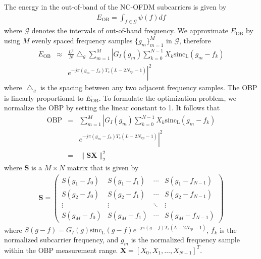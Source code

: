 \documentclass[paper]{ieice}
\begin{document}
The energy in the out-of-band of the NC-OFDM subcarriers is given by
\begin{eqnarray}
E_{\mathrm{OB}} = \int_{f\in \mathcal{G}}\psi(f) df \label{eq:Energy}
\end{eqnarray} 
where $\mathcal{G}$ denotes the intervals of out-of-band frequency.  
We approximate $E_{\mathrm{OB}}$ by using $M$ evenly spaced frequency samples $\{g_{m}\}_{m=1}^{M}$ in $\mathcal{G}$, therefore
\begin{eqnarray}
E_{\mathrm{OB}} & \approx & \frac{L^2}{N}\bigtriangleup_g  \sum_{m=1}^{M} \left|G_I(g_m)\sum_{k=0}^{N-1} X_{k} \mathrm{sinc_L}(g_{m} - f_k)\right. \nonumber\\
&&\left.e^{-j\pi(g_{m} - f_k)T_s(L - 2N_{cp} -1)}\right|^{2} \label{eq: E_OBP}
\end{eqnarray} 
where $\bigtriangleup_g$ is the spacing between any two adjacent frequency samples. The OBP is linearly proportional to $E_{\mathrm{OB}}$.  To formulate the optimization problem, we normalize the OBP by setting the linear constant to 1.  It follows that
\begin{eqnarray}\label{eq:obp}
\mathrm{OBP} &=& \sum_{m=1}^{M} \left|G_I(g_m)\sum_{k=0}^{N-1} X_{k} \mathrm{sinc_L}(g_{m} - f_k)\right. \nonumber\\
&&\left.e^{-j\pi(g_{m} - f_k)T_s(L - 2N_{cp} -1)}\right|^{2}\\
&=& \|\mathbf{S}\mathbf{X}\|_2^2
\end{eqnarray}
where $\mathbf{S}$ is a $M\times N$ matrix that is given by
\mathindent=0mm
\begin{eqnarray}
\mathbf{S} = 
     \begin{pmatrix}
       S(g_1-f_0) & S(g_1-f_1) & \cdots  &  S(g_1-f_{N-1})     \\
       S(g_2-f_0) & S(g_2-f_1) & \cdots  &  S(g_2-f_{N-1})     \\
       \vdots     & \vdots      & \ddots  &  \vdots             \\
       S(g_M-f_0) & S(g_M-f_1) & \cdots  &  S(g_M-f_{N-1})
     \end{pmatrix}\nonumber
\end{eqnarray}
\mathindent=7mm
where $S(g-f) = G_I(g)\mathrm{sinc_L}(g-f)e^{-j\pi(g - f)T_s(L - 2N_{cp} -1)}$, $f_{k}$ is the normalized subcarrier frequency, and $g_{m}$ is the normalized frequency sample within the OBP measurement range. $\mathbf{X} = [X_{0}, X_{1}, \ldots, X_{N-1}]^{T}$.
\end{document}
